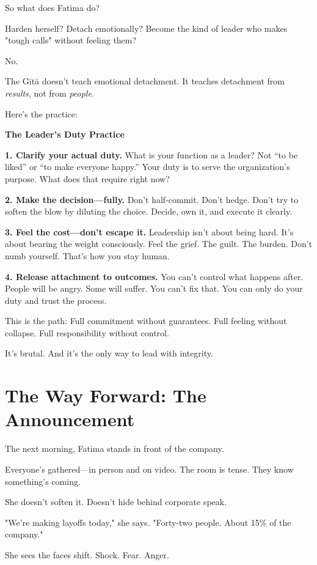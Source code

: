 \documentclass[11pt,twoside]{book}
\begin{document}
So what does Fatima do?

Harden herself? Detach emotionally? Become the kind of leader who makes "tough calls" without feeling them?

No.

The Gītā doesn't teach emotional detachment. It teaches detachment from \emph{results}, not from \emph{people}.

Here's the practice:

\begin{practicebox}
\textbf{The Leader's Duty Practice}

\textbf{1. Clarify your actual duty.}
What is your function as a leader? Not ``to be liked'' or ``to make everyone happy.'' Your duty is to serve the organization's purpose. What does that require right now?

\textbf{2. Make the decision—fully.}
Don't half-commit. Don't hedge. Don't try to soften the blow by diluting the choice. Decide, own it, and execute it clearly.

\textbf{3. Feel the cost—don't escape it.}
Leadership isn't about being hard. It's about bearing the weight consciously. Feel the grief. The guilt. The burden. Don't numb yourself. That's how you stay human.

\textbf{4. Release attachment to outcomes.}
You can't control what happens after. People will be angry. Some will suffer. You can't fix that. You can only do your duty and trust the process.
\end{practicebox}

This is the path: Full commitment without guarantees. Full feeling without collapse. Full responsibility without control.

It's brutal. And it's the only way to lead with integrity.

\section*{The Way Forward: The Announcement}

The next morning, Fatima stands in front of the company.

Everyone's gathered—in person and on video. The room is tense. They know something's coming.

She doesn't soften it. Doesn't hide behind corporate speak.

"We're making layoffs today," she says. "Forty-two people. About 15\% of the company."

She sees the faces shift. Shock. Fear. Anger.
\end{document}
